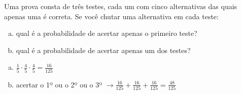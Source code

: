 \begin{ex}
Uma prova consta de três testes, cada um com cinco alternativas das quais apenas uma é correta. Se você chutar uma alternativa em cada teste:
   \begin{enumerate}[(a)]
   \item qual é a probabilidade de acertar apenas o primeiro teste?
   \item qual é a probabilidade de acertar apenas um dos testes?
   \end{enumerate}
     \begin{sol}
      \phantom{A}
       \begin{enumerate} [(a)]
           \item $\frac{1}{5}\cdot\frac{4}{5}\cdot\frac{4}{5}=\frac{16}{125}$
           \item acertar o 1º ou o 2º ou o 3º
        $\rightarrow\frac{16}{125}+\frac{16}{125}+\frac{16}{125}=\frac{48}{125}$
       \end{enumerate}
     \end{sol}
\end{ex}